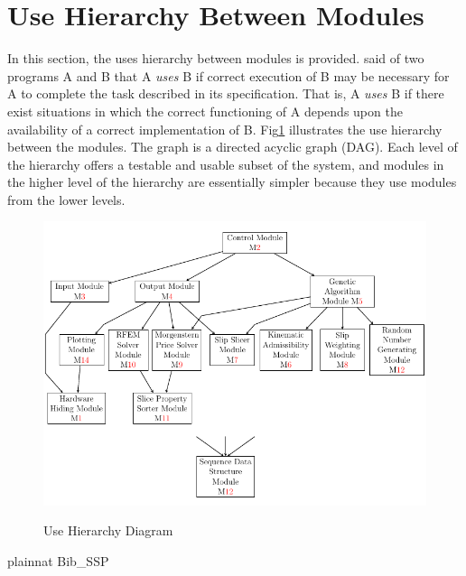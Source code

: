 \documentclass[12pt]{article}
\newcounter{fnum}
\newcommand{\fref}[1]{Fig\ref{#1}}
\begin{document}
\section{Use Hierarchy Between Modules} \label{SecUse}

\hspace{3ex}In this section, the uses hierarchy between modules is
provided. \cite{Parnas1978} said of two programs A and B that A {\em
  uses} B if correct execution of B may be necessary for A to complete
the task described in its specification. That is, A {\em uses} B if
there exist situations in which the correct functioning of A depends
upon the availability of a correct implementation of B. 
\fref{Fig_Use} illustrates the use hierarchy between the modules. The
graph is a directed acyclic graph (DAG). Each level of the hierarchy
offers a testable and usable subset of the system, and modules in the
higher level of the hierarchy are essentially simpler because they use
modules from the lower levels.

\newpage

\begin{figure}[h!]   \label{Fig_Use}
\begin{center}
{
 \includegraphics[width=1.1\textwidth]{UseHierarchyDiagram3.png}
}
\caption{Use Hierarchy Diagram}
\end{center}
\end{figure}
\newpage
 {plainnat}
 {Bib_SSP}
\end{document}
